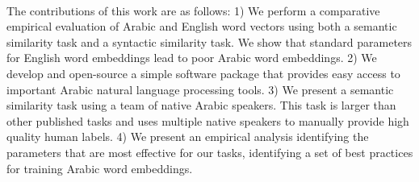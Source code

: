 \\
The contributions of this work are as follows: 1) We perform a comparative empirical evaluation of Arabic and English word vectors using both a semantic similarity task and a syntactic similarity task. We show that standard parameters for English word embeddings lead to poor Arabic word embeddings. 2) We develop and open-source a simple software package that provides easy access to important Arabic natural language processing tools. 3) We present a semantic similarity task using a team of native Arabic speakers. This task is larger than other published tasks and uses multiple native speakers to manually provide high quality human labels. 4) We present an empirical analysis identifying the parameters that are most effective for our tasks, identifying a set of best practices for training Arabic word embeddings.